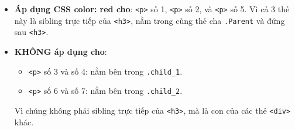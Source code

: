 \documentclass[11pt,oneside]{book}
\newcommand{\codeinline}[1]{\textcolor{accentOrange}{\texttt{#1}}}
\begin{document}
\begin{noteBox}
\begin{itemize}[leftmargin=1.5em, itemsep=3pt, parsep=0pt]
    \item \textcolor{tipBorder}{\textbf{Áp dụng CSS color: red cho}}: \codeinline{<p>} số 1, \codeinline{<p>} số 2, và \codeinline{<p>} số 5. Vì cả 3 thẻ này là sibling trực tiếp của \codeinline{<h3>}, nằm trong cùng thẻ cha \codeinline{.Parent} và đứng sau \codeinline{<h3>}.
    \item \textcolor{warnBorder}{\textbf{KHÔNG áp dụng cho}}:
    \begin{itemize}[leftmargin=1.2em, itemsep=2pt, parsep=0pt]
        \item \codeinline{<p>} số 3 và số 4: nằm bên trong \codeinline{.child\_1}.
        \item \codeinline{<p>} số 6 và số 7: nằm bên trong \codeinline{.child\_2}.
    \end{itemize}
    Vì chúng không phải sibling trực tiếp của \codeinline{<h3>}, mà là con của các thẻ \codeinline{<div>} khác.
\end{itemize}
\end{noteBox}
\end{document}
